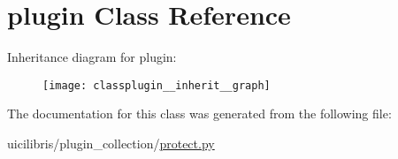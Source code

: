 \hypertarget{classplugin}{\section{plugin \-Class \-Reference}
\label{classplugin}
}


\-Inheritance diagram for plugin\-:
\nopagebreak
\begin{figure}[H]
\begin{center}
\leavevmode
\texttt{[image: classplugin\_\_inherit\_\_graph]}
\end{center}
\end{figure}


\-The documentation for this class was generated from the following file\-:\begin{DoxyCompactItemize}
\item 
uicilibris/plugin\-\_\-collection/\hyperlink{protect_8py}{protect.\-py}\end{DoxyCompactItemize}
